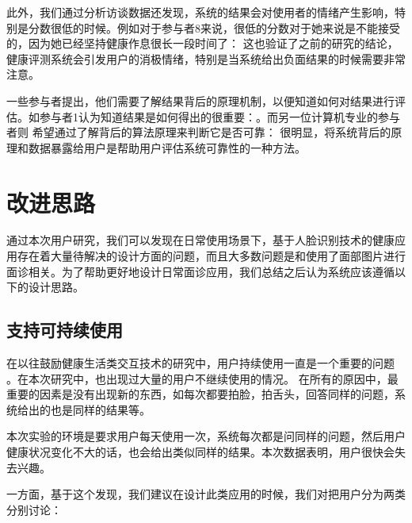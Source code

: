 此外，我们通过分析访谈数据还发现，系统的结果会对使用者的情绪产生影响，特别是分数很低的时候。例如对于参与者8来说，很低的分数对于她来说是不能接受的，因为她已经坚持健康作息很长一段时间了： 这也验证了之前的研究\cite{Toscos2013Designing}的结论，健康评测系统会引发用户的消极情绪，特别是当系统给出负面结果的时候需要非常注意。

一些参与者提出，他们需要了解结果背后的原理机制，以便知道如何对结果进行评估。如参与者1认为知道结果是如何得出的很重要：。而另一位计算机专业的参与者则
希望通过了解背后的算法原理来判断它是否可靠： 很明显，将系统背后的原理和数据暴露给用户是帮助用户评估系统可靠性的一种方法。

\section{改进思路}

通过本次用户研究，我们可以发现在日常使用场景下，基于人脸识别技术的健康应用存在着大量待解决的设计方面的问题，而且大多数问题是和使用了面部图片进行面诊相关。为了帮助更好地设计日常面诊应用，我们总结之后认为系统应该遵循以下的设计思路。

\subsection{支持可持续使用}
在以往鼓励健康生活类交互技术的研究中，用户持续使用一直是一个重要的问题\cite{Clawson2015No} \cite{Epstein2016Beyond}。在本次研究中，也出现过大量的用户不继续使用的情况。
在所有的原因中，最重要的因素是没有出现新的东西，如每次都要拍脸，拍舌头，回答同样的问题，系统给出的也是同样的结果等。

本次实验的环境是要求用户每天使用一次，系统每次都是问同样的问题，然后用户健康状况变化不大的话，也会给出类似同样的结果。本次数据表明，用户很快会失去兴趣。

一方面，基于这个发现，我们建议在设计此类应用的时候，我们对把用户分为两类分别讨论：

